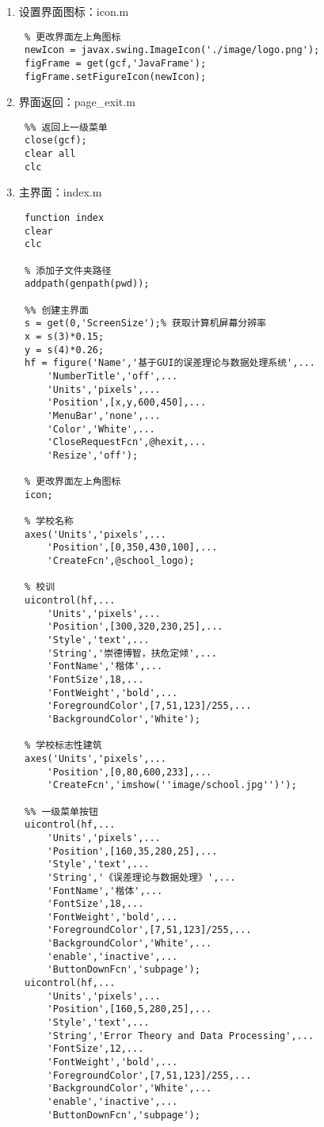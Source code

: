 \begin{enumerate}
	\item 设置界面图标：icon.m
	\begin{lstlisting}
 % 更改界面左上角图标
 newIcon = javax.swing.ImageIcon('./image/logo.png');
 figFrame = get(gcf,'JavaFrame');
 figFrame.setFigureIcon(newIcon);\end{lstlisting}
	\item 界面返回：page\_exit.m
	\begin{lstlisting}
 %% 返回上一级菜单
 close(gcf);
 clear all
 clc\end{lstlisting}
 	\item 主界面：index.m
	\begin{lstlisting}
 function index
 clear
 clc
 
 % 添加子文件夹路径
 addpath(genpath(pwd));
 
 %% 创建主界面
 s = get(0,'ScreenSize');% 获取计算机屏幕分辨率
 x = s(3)*0.15;
 y = s(4)*0.26;
 hf = figure('Name','基于GUI的误差理论与数据处理系统',...
     'NumberTitle','off',...
     'Units','pixels',...
     'Position',[x,y,600,450],...
     'MenuBar','none',...
     'Color','White',...
     'CloseRequestFcn',@hexit,...
     'Resize','off');
 
 % 更改界面左上角图标
 icon;
 
 % 学校名称
 axes('Units','pixels',...
     'Position',[0,350,430,100],...
     'CreateFcn',@school_logo);
 
 % 校训
 uicontrol(hf,...
     'Units','pixels',...
     'Position',[300,320,230,25],...
     'Style','text',...
     'String','崇德博智，扶危定倾',...
     'FontName','楷体',...
     'FontSize',18,...
     'FontWeight','bold',...
     'ForegroundColor',[7,51,123]/255,...
     'BackgroundColor','White');
 
 % 学校标志性建筑
 axes('Units','pixels',...
     'Position',[0,80,600,233],...
     'CreateFcn','imshow(''image/school.jpg'')');
 
 %% 一级菜单按钮
 uicontrol(hf,...
     'Units','pixels',...
     'Position',[160,35,280,25],...
     'Style','text',...
     'String','《误差理论与数据处理》',...
     'FontName','楷体',...
     'FontSize',18,...
     'FontWeight','bold',...
     'ForegroundColor',[7,51,123]/255,...
     'BackgroundColor','White',...
     'enable','inactive',...
     'ButtonDownFcn','subpage');
 uicontrol(hf,...
     'Units','pixels',...
     'Position',[160,5,280,25],...
     'Style','text',...
     'String','Error Theory and Data Processing',...
     'FontSize',12,...
     'FontWeight','bold',...
     'ForegroundColor',[7,51,123]/255,...
     'BackgroundColor','White',...
     'enable','inactive',...
     'ButtonDownFcn','subpage');
 

\end{lstlisting}
\end{enumerate}
